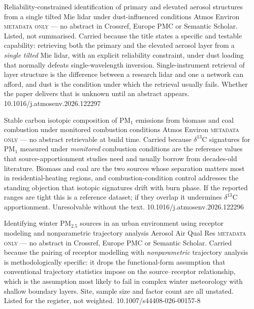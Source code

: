 \documentclass[10pt]{article}
\begin{document}
{Reliability-constrained identification of primary and elevated aerosol structures from a
single tilted Mie lidar under dust-influenced conditions}
{Atmos Environ}
{\textsc{metadata only} --- no abstract in Crossref, Europe PMC or Semantic Scholar.
Listed, not summarised. Carried because the title states a specific and testable
capability: retrieving both the primary and the elevated aerosol layer from a
\emph{single tilted} Mie lidar, with an explicit reliability constraint, under dust
loading that normally defeats single-wavelength inversion. Single-instrument retrieval of
layer structure is the difference between a research lidar and one a network can afford,
and dust is the condition under which the retrieval usually fails. Whether the paper
delivers that is unknown until an abstract appears.}
{10.1016/j.atmosenv.2026.122297}

{Stable carbon isotopic composition of PM$_1$ emissions from biomass and coal combustion
under monitored combustion conditions}
{Atmos Environ}
{\textsc{metadata only} --- no abstract retrievable at build time. Carried because
$\delta^{13}$C signatures for PM$_1$ measured under \emph{monitored} combustion
conditions are the reference values that source-apportionment studies need and usually
borrow from decades-old literature. Biomass and coal are the two sources whose
separation matters most in residential-heating regions, and combustion-condition control
addresses the standing objection that isotopic signatures drift with burn phase. If the
reported ranges are tight this is a reference dataset; if they overlap it undermines
$\delta^{13}$C apportionment. Unresolvable without the text.}
{10.1016/j.atmosenv.2026.122296}

{Identifying winter PM$_{2.5}$ sources in an urban environment using receptor modeling
and nonparametric trajectory analysis}
{Aerosol Air Qual Res}
{\textsc{metadata only} --- no abstract in Crossref, Europe PMC or Semantic Scholar.
Carried because the pairing of receptor modelling with \emph{nonparametric} trajectory
analysis is methodologically specific: it drops the functional-form assumption that
conventional trajectory statistics impose on the source--receptor relationship, which is
the assumption most likely to fail in complex winter meteorology with shallow boundary
layers. Site, sample size and factor count are all unstated. Listed for the register, not
weighted.}
{10.1007/s44408-026-00157-8}
\end{document}
